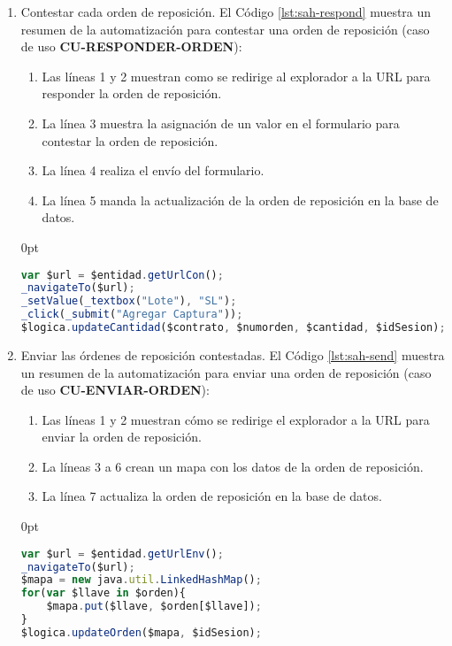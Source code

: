 \begin{enumerate}
	\item Contestar cada orden de reposición. El Código \ref{lst:sah-respond} muestra un resumen de la automatización para contestar una orden de reposición (caso de uso \textbf{CU-RESPONDER-ORDEN}):
	\begin{enumerate}
		\item Las líneas 1 y 2 muestran como se redirige al explorador a la URL para responder la orden de reposición.
		\item  La línea 3 muestra la asignación de un valor en el formulario para contestar la orden de reposición.
		\item La línea 4 realiza el envío del formulario.
		\item La línea 5 manda la actualización de la orden de reposición en la base de datos.
	\end{enumerate}
	\begin{adjustwidth}{\listingfixwidth}{0pt}
	\begin{lstlisting}[language=Javascript, caption={Responder orden de reposición.}, captionpos=b, label={lst:sah-respond}]
var $url = $entidad.getUrlCon();
_navigateTo($url);
_setValue(_textbox("Lote"), "SL");
_click(_submit("Agregar Captura"));
$logica.updateCantidad($contrato, $numorden, $cantidad, $idSesion);
	\end{lstlisting}
	\end{adjustwidth}

	\item Enviar las órdenes de reposición contestadas. El Código \ref{lst:sah-send} muestra un resumen de la automatización para enviar una orden de reposición (caso de uso \textbf{CU-ENVIAR-ORDEN}):
	\begin{enumerate}
		\item Las líneas 1 y 2 muestran cómo se redirige el explorador a la URL para enviar la orden de reposición.
		\item La líneas 3 a 6 crean un mapa con los datos de la orden de reposición.
		\item La línea 7 actualiza la orden de reposición en la base de datos. 
	\end{enumerate}
	\begin{adjustwidth}{\listingfixwidth}{0pt}
	\begin{lstlisting}[language=Javascript, caption={Enviar orden de reposición.}, captionpos=b, label={lst:sah-send}]
var $url = $entidad.getUrlEnv();
_navigateTo($url);
$mapa = new java.util.LinkedHashMap();
for(var $llave in $orden){
	$mapa.put($llave, $orden[$llave]);
}
$logica.updateOrden($mapa, $idSesion);
	\end{lstlisting}
	\end{adjustwidth}
\end{enumerate}


